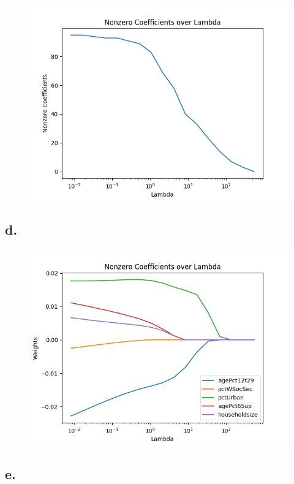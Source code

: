 \documentclass{article}
\newcommand{\1}{\mathbf{1}}
\begin{document}
{\begin{figure}[ht!]
  \centering
  \includegraphics[width=180mm]{../hw2-code/results/a5_c.png}
\end{figure}

\newpage

\subsection*{d.}

\begin{figure}[ht!]
  \centering
  \includegraphics[width=120mm]{../hw2-code/results/a5_d.png}
\end{figure}

\subsection*{e.}

}
\end{document}
